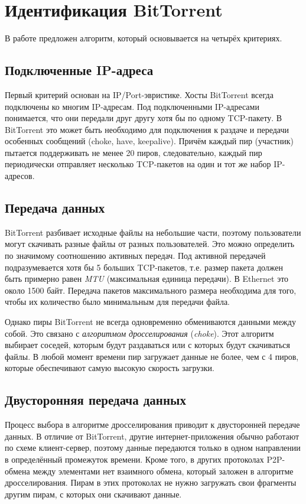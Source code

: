 \documentclass[bachelor, och, coursework]{SCWorks}
\begin{document}
\section{Идентификация BitTorrent}
В работе \cite{bittorrent} предложен алгоритм, который основывается на четырёх критериях.

\subsection{Подключенные IP-адреса}
Первый критерий основан на IP/Port-эвристике. Хосты BitTorrent всегда подключены ко многим IP-адресам.
Под подключенными IP-адресами понимается, что они передали друг другу хотя бы
по одному TCP-пакету. В BitTorrent это может быть необходимо для подключения к раздаче и передачи особенных
сообщений (choke, have, keepalive). Причём каждый пир (участник) пытается поддерживать не менее 20 пиров, следовательно,
каждый пир периодически отправляет несколько TCP-пакетов на один и тот же набор IP-адресов.

\subsection{Передача данных}
BitTorrent разбивает исходные файлы на небольшие части, поэтому пользователи могут скачивать разные файлы
от разных пользователей. Это можно определить по значимому соотношению активных передач. Под активной передачей
подразумевается хотя бы 5 больших TCP-пакетов, т.е. размер пакета должен быть примерно равен \textit{MTU} (максимальная единица передачи). В Ethernet это около 1500 байт. Передача пакетов максимального размера необходима для того, 
чтобы их количество было минимальным для передачи файла.

Однако пиры BitTorrent не всегда одновременно обмениваются данными между собой. 
Это связано с \textit{алгоритмом дросселирования} (\textit{choke}). Этот алгоритм выбирает соседей, которым будут раздаваться или с которых будут скачиваться файлы. В любой момент времени пир загружает данные не более, чем 
с 4 пиров, которые обеспечивают самую высокую скорость загрузки. %
 
\subsection{Двусторонняя передача данных}
Процесс выбора в алгоритме дросселирования приводит к двусторонней передаче данных. В отличие от BitTorrent, другие 
интернет-приложения обычно работают по схеме клиент-сервер, поэтому данные передаются только в одном направлении в 
определённый промежуток времени. Кроме того, в других протоколах P2P-обмена между элементами нет взаимного обмена,
который заложен в алгоритме дросселирования. Пирам в этих протоколах не нужно загружать свои фрагменты другим пирам,
с которых они скачивают данные. 
\end{document}
